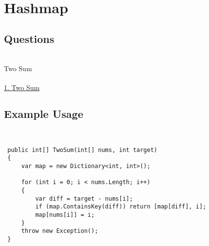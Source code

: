 \chapter{Hashmap}

\section{Questions}\\

Two Sum\\ \\
\href{https://leetcode.com/problems/two-sum/description/}{1. Two Sum}


\section{Example Usage}\\



\begin{lstlisting}
 public int[] TwoSum(int[] nums, int target)
 {
     var map = new Dictionary<int, int>();

     for (int i = 0; i < nums.Length; i++)
     {
         var diff = target - nums[i];
         if (map.ContainsKey(diff)) return [map[diff], i];
         map[nums[i]] = i;
     }
     throw new Exception();
 }
\end{lstlisting}\\ \\


